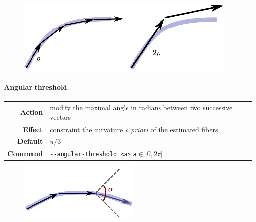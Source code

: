             \begin{figure}
                \centering
                \includegraphics[height=0.1\textheight]{stepSize}
                \caption{}
            \end{figure}

        \paragraph*{Angular threshold}
            \begin{center}
                \begin{tabular}{rl}
                    \textbf{Action}  & modify the maximal angle in radians between two successive vectors\\
                    \textbf{Effect}  & constraint the curvature \emph{a priori} of the estimated fibers\\
                    \textbf{Default} & $\pi/3$\\
                    \textbf{Command} & \texttt{-\hspace{0.1mm}-angular-threshold <a>} \hfill \texttt{a}$\in]0,2\pi[$
                \end{tabular}
            \end{center}

            \begin{figure}
                \centering
                \includegraphics[height=0.1\textheight]{angleThreshold}
                \caption{}
            \end{figure}

